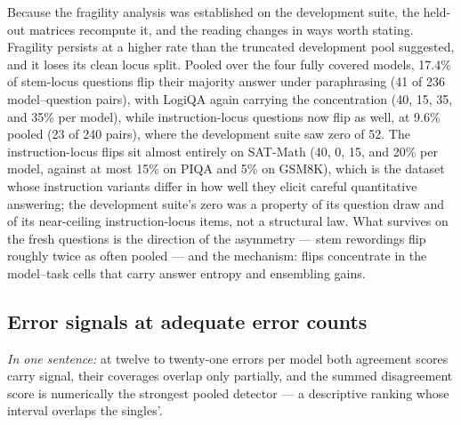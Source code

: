 Because the fragility analysis was established on the development suite, the held-out matrices recompute it, and the reading changes in ways worth stating. Fragility persists at a higher rate than the truncated development pool suggested, and it loses its clean locus split. Pooled over the four fully covered models, 17.4\% of stem-locus questions flip their majority answer under paraphrasing (41 of 236 model--question pairs), with LogiQA again carrying the concentration (40, 15, 35, and 35\% per model), while instruction-locus questions now flip as well, at 9.6\% pooled (23 of 240 pairs), where the development suite saw zero of 52. The instruction-locus flips sit almost entirely on SAT-Math (40, 0, 15, and 20\% per model, against at most 15\% on PIQA and 5\% on GSM8K), which is the dataset whose instruction variants differ in how well they elicit careful quantitative answering; the development suite's zero was a property of its question draw and of its near-ceiling instruction-locus items, not a structural law. What survives on the fresh questions is the direction of the asymmetry --- stem rewordings flip roughly twice as often pooled --- and the mechanism: flips concentrate in the model--task cells that carry answer entropy and ensembling gains.

\subsection{Error signals at adequate error counts}
\label{sec:heldouterror}

\emph{In one sentence:} at twelve to twenty-one errors per model both agreement scores carry signal, their coverages overlap only partially, and the summed disagreement score is numerically the strongest pooled detector --- a descriptive ranking whose interval overlaps the singles'.

\begin{table}[tbp]
\centering
\footnotesize
\caption{Held-out error-signal analysis. Reference errors are those of the COMB-12 ensemble; detectors are reversed agreement scores ($c_S$ over the six canonical samples, $c_P$ over the six paraphrase first decodes, Both their summed disagreement), reported as AUROC with question-level bootstrap 95\% intervals (cluster bootstrap over questions for the pooled row); every fully covered model carries twelve to twenty-one reference errors, so no row is descriptive-only. Flagged counts the reference errors on which the given source shows any dissent; by construction the union of the two flagged sets contains each single set, so Either-coverage is an upper bound by definition. $^{\S}$Qwen3.7-Flash partial replication (60 of 119 questions) with the self-preference caveat of Section~\ref{sec:setup}; excluded from the pooled row.}
\label{tab:uncertexp}

\end{table}


